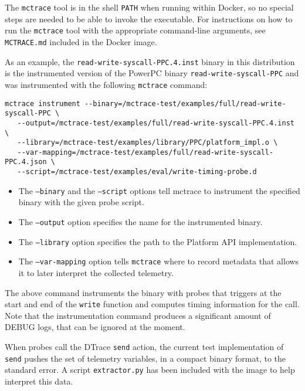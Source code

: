The \texttt{mctrace} tool is in the shell \texttt{PATH} when running within Docker,
so no special steps are needed to be able to invoke the executable.
For instructions on how to run the \texttt{mctrace} tool with the appropriate
command-line arguments, see \texttt{MCTRACE.md} included in the Docker image.

As an example, the \texttt{read-write-syscall-PPC.4.inst} binary in this
distribution is the instrumented version of the PowerPC binary
\texttt{read-write-syscall-PPC} and was instrumented with the following
\texttt{mctrace} command:

\begin{verbatim}
mctrace instrument --binary=/mctrace-test/examples/full/read-write-syscall-PPC \
   --output=/mctrace-test/examples/full/read-write-syscall-PPC.4.inst \
   --library=/mctrace-test/examples/library/PPC/platform_impl.o \
   --var-mapping=/mctrace-test/examples/full/read-write-syscall-PPC.4.json \
   --script=/mctrace-test/examples/eval/write-timing-probe.d
\end{verbatim}

\begin{itemize}
\item The \texttt{--binary} and the \texttt{--script} options tell mctrace to instrument
  the specified binary with the given probe script.
\item The \texttt{--output} option specifies the name for the instrumented binary.
\item The \texttt{--library} option specifies the path to the Platform API
  implementation.
\item The \texttt{--var-mapping} option tells \texttt{mctrace} where to record metadata
  that allows it to later interpret the collected telemetry.
\end{itemize}

The above command instruments the binary with probes that triggers
at the start and end of the \texttt{write} function and computes timing
information for the call. Note that the instrumentation command produces
a significant amount of DEBUG logs, that can be ignored at the moment.

When probes call the DTrace \texttt{send} action, the current test
implementation of \texttt{send} pushes the set of telemetry variables, in a
compact binary format, to the standard error. A script \texttt{extractor.py}
has been included with the image to help interpret this data.

